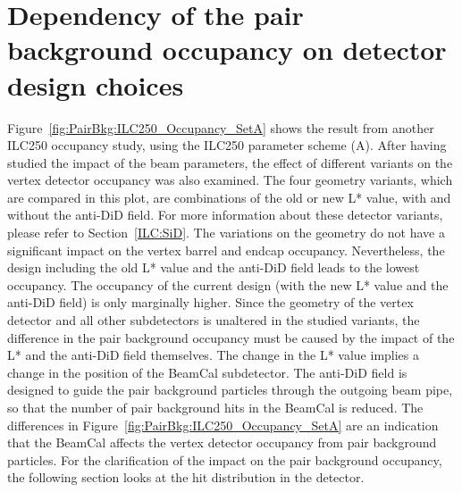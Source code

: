 \section{Dependency of the pair background occupancy on detector design choices}
Figure~\ref{fig:PairBkg:ILC250_Occupancy_SetA} shows the result from another ILC250 occupancy study, using the ILC250 parameter scheme (A).
After having studied the impact of the beam parameters, the effect of different \sid variants on the vertex detector occupancy was also examined.
The four geometry variants, which are compared in this plot, are combinations of the old or new L* value, with and without the \sid anti-DiD field.
For more information about these detector variants, please refer to Section~\ref{ILC:SiD}.
The variations on the \sid geometry do not have a significant impact on the vertex barrel and endcap occupancy. 
Nevertheless, the \sid design including the old L* value and the anti-DiD field leads to the lowest occupancy.
The occupancy of the current design (with the new L* value and the anti-DiD field) is only marginally higher.
Since the geometry of the vertex detector and all other subdetectors is unaltered in the studied \sid variants, the difference in the pair background occupancy must be caused by the impact of the L* and the anti-DiD field themselves.
The change in the L* value implies a change in the position of the BeamCal subdetector.
The anti-DiD field is designed to guide the pair background particles through the outgoing beam pipe, so that the number of pair background hits in the BeamCal is reduced.
The differences in Figure~\ref{fig:PairBkg:ILC250_Occupancy_SetA} are an indication that the \sid BeamCal affects the vertex detector occupancy from pair background particles.
For the clarification of the impact on the pair background occupancy, the following section looks at the hit distribution in the \sid detector.
